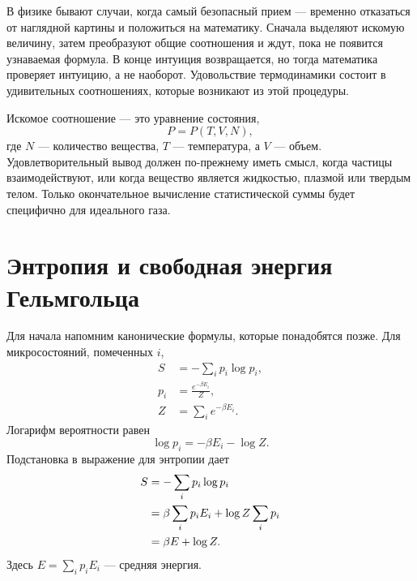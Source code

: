 В физике бывают случаи, когда самый безопасный прием — временно отказаться от наглядной картины и положиться на математику. Сначала выделяют искомую величину, затем преобразуют общие соотношения и ждут, пока не появится узнаваемая формула. В конце интуиция возвращается, но тогда математика проверяет интуицию, а не наоборот. Удовольствие термодинамики состоит в удивительных соотношениях, которые возникают из этой процедуры.

Искомое соотношение — это уравнение состояния,
\begin{equation}
 P=P(T,V,N),
 \label{eq:sm5-equation-of-state-target}
\end{equation}
где \(N\) — количество вещества, \(T\) — температура, а \(V\) — объем. Удовлетворительный вывод должен по-прежнему иметь смысл, когда частицы взаимодействуют, или когда вещество является жидкостью, плазмой или твердым телом. Только окончательное вычисление статистической суммы будет специфично для идеального газа.

\section{Энтропия и свободная энергия Гельмгольца}

Для начала напомним канонические формулы, которые понадобятся позже. Для микросостояний, помеченных \(i\),
\begin{equation}
 \begin{aligned}
 S&=-\sum_i p_i\log p_i,\\
 p_i&=\frac{e^{-\beta E_i}}{Z},\\
 Z&=\sum_i e^{-\beta E_i}.
 \end{aligned}
 \label{eq:sm5-canonical-definitions}
\end{equation}
Логарифм вероятности равен
\begin{equation}
 \log p_i=-\beta E_i-\log Z.
 \label{eq:sm5-log-probability}
\end{equation}
Подстановка в выражение для энтропии дает
\begin{align}
 S
 &=-\sum_i p_i\log p_i \notag\\
 &=\beta\sum_i p_iE_i+\log Z\sum_i p_i \notag\\
 &=\beta E+\log Z.
 \label{eq:sm5-entropy-log-z}
\end{align}
Здесь \(E=\sum_i p_iE_i\) — средняя энергия.

\begin{classroomqa}
\end{classroomqa}

